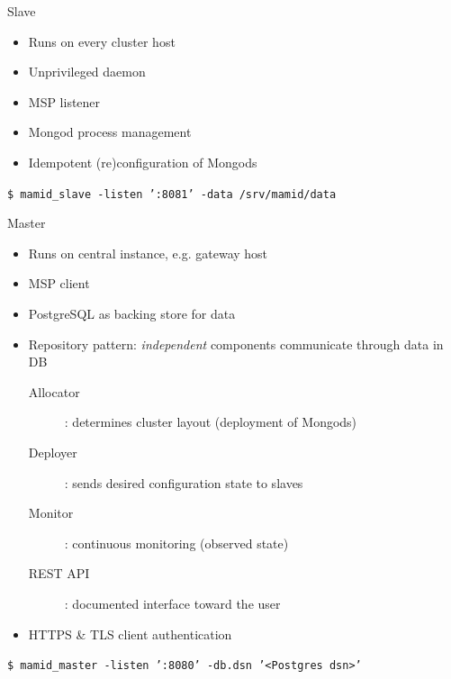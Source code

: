 \documentclass[11pt,aspectratio=169]{beamer}
\begin{document}

    \begin{frame}{Slave}
        
           \begin{itemize}
               \item Runs on every cluster host
               \item Unprivileged daemon
               \item MSP listener
               \item Mongod process management
               \item Idempotent (re)configuration of Mongods
            \end{itemize}
            \vspace{15pt}
            \texttt{\$ mamid\_slave -listen ':8081' -data /srv/mamid/data}
    \end{frame}
    
    
    \begin{frame}{Master}
        
        \begin{itemize}
            \item Runs on central instance, e.g. gateway host
            \item MSP client
            \item PostgreSQL as backing store for data
            \item Repository pattern: \textit{independent} components communicate through data in DB
            \begin{description}
                 \item[Allocator]: determines cluster layout (deployment of Mongods)
                 \item[Deployer]: sends desired configuration state to slaves
                 \item[Monitor]: continuous monitoring (observed state)
                 \item[REST API]: documented interface toward the user
            \end{description}
            \item HTTPS \& TLS client authentication
        \end{itemize}
        \vspace{15pt}
        \texttt{\$ mamid\_master -listen ':8080' -db.dsn '<Postgres dsn>'}
        
    \end{frame}   
    
\end{document}
